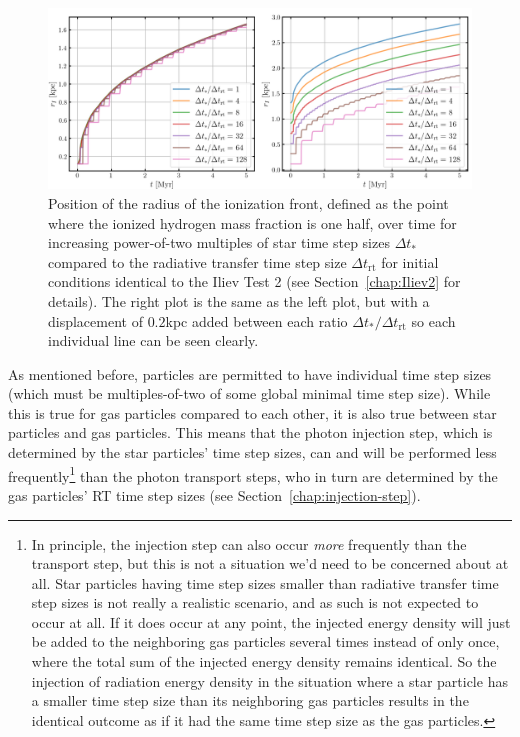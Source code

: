 \begin{figure}
\centering
\includegraphics[width=\textwidth]{figures/RHD/injection_timesteps/ionization_fronts.png}%
\caption{
Position of the radius of the ionization front, defined as the point where the ionized hydrogen mass
fraction is one half, over time for increasing power-of-two multiples of star time step sizes
$\Delta t_*$ compared to the radiative transfer time step size $\Delta t_{\mathrm{rt}}$ for initial
conditions identical to the Iliev Test 2 (see Section~\ref{chap:Iliev2} for details). The right
plot is the same as the left plot, but with a displacement of $0.2$kpc added between each ratio
$\Delta t_* / \Delta t_{\mathrm{rt}}$ so each individual line can be seen clearly.
}
\label{fig:injection-timesteps-ionization-front-radius}
\end{figure}



As mentioned before, particles are permitted to have individual time step sizes (which must be
multiples-of-two of some global minimal time step size). While this is true for gas particles
compared to each other, it is also true between star particles and gas particles. This means that
the photon injection step, which is determined by the star particles' time step sizes, can and will
be performed less frequently\footnote{In principle, the injection step can also occur \emph{more}
frequently than the transport step, but this is not a situation we'd need to be concerned about at
all. Star particles having time step sizes smaller than radiative transfer time step sizes
is not really a realistic scenario, and as such is not expected to occur at all. If it does occur
at any point, the injected energy density will just be added to the neighboring gas particles
several times instead of only once, where the total sum of the injected energy density remains
identical. So the injection of radiation energy density in the situation where a star particle has
a smaller time step size than its neighboring gas particles results in the identical outcome as if
it had the same time step size as the gas particles.}
than the photon transport steps, who in turn are determined by the gas particles' RT time step sizes
(see Section~\ref{chap:injection-step}).


